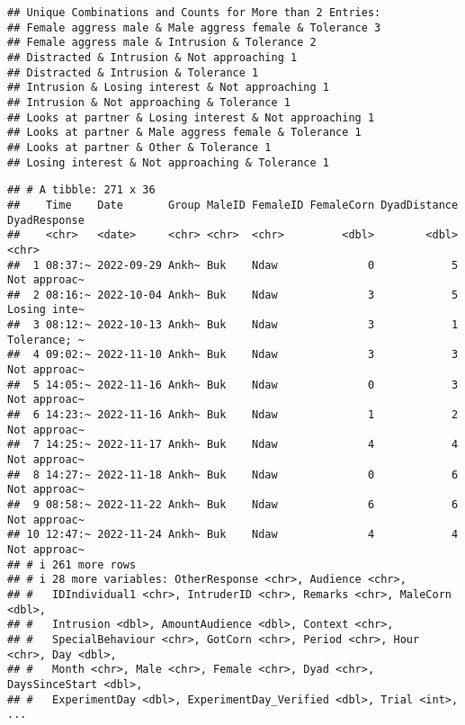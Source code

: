 \documentclass[
]{article}
\begin{document}
\begin{verbatim}
## Unique Combinations and Counts for More than 2 Entries:
## Female aggress male & Male aggress female & Tolerance 3
## Female aggress male & Intrusion & Tolerance 2
## Distracted & Intrusion & Not approaching 1
## Distracted & Intrusion & Tolerance 1
## Intrusion & Losing interest & Not approaching 1
## Intrusion & Not approaching & Tolerance 1
## Looks at partner & Losing interest & Not approaching 1
## Looks at partner & Male aggress female & Tolerance 1
## Looks at partner & Other & Tolerance 1
## Losing interest & Not approaching & Tolerance 1
\end{verbatim}

\begin{verbatim}
## # A tibble: 271 x 36
##    Time    Date       Group MaleID FemaleID FemaleCorn DyadDistance DyadResponse
##    <chr>   <date>     <chr> <chr>  <chr>         <dbl>        <dbl> <chr>       
##  1 08:37:~ 2022-09-29 Ankh~ Buk    Ndaw              0            5 Not approac~
##  2 08:16:~ 2022-10-04 Ankh~ Buk    Ndaw              3            5 Losing inte~
##  3 08:12:~ 2022-10-13 Ankh~ Buk    Ndaw              3            1 Tolerance; ~
##  4 09:02:~ 2022-11-10 Ankh~ Buk    Ndaw              3            3 Not approac~
##  5 14:05:~ 2022-11-16 Ankh~ Buk    Ndaw              0            3 Not approac~
##  6 14:23:~ 2022-11-16 Ankh~ Buk    Ndaw              1            2 Not approac~
##  7 14:25:~ 2022-11-17 Ankh~ Buk    Ndaw              4            4 Not approac~
##  8 14:27:~ 2022-11-18 Ankh~ Buk    Ndaw              0            6 Not approac~
##  9 08:58:~ 2022-11-22 Ankh~ Buk    Ndaw              6            6 Not approac~
## 10 12:47:~ 2022-11-24 Ankh~ Buk    Ndaw              4            4 Not approac~
## # i 261 more rows
## # i 28 more variables: OtherResponse <chr>, Audience <chr>,
## #   IDIndividual1 <chr>, IntruderID <chr>, Remarks <chr>, MaleCorn <dbl>,
## #   Intrusion <dbl>, AmountAudience <dbl>, Context <chr>,
## #   SpecialBehaviour <chr>, GotCorn <chr>, Period <chr>, Hour <chr>, Day <dbl>,
## #   Month <chr>, Male <chr>, Female <chr>, Dyad <chr>, DaysSinceStart <dbl>,
## #   ExperimentDay <dbl>, ExperimentDay_Verified <dbl>, Trial <int>, ...
\end{verbatim}
\end{document}
